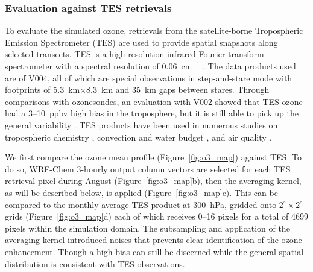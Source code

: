 \subsubsection{Evaluation against TES retrievals}\label{sect:val/o3/tes}


To evaluate the simulated ozone, retrievals from the satellite-borne
Tropospheric Emission Spectrometer (TES) are used to provide spatial snapshots
along selected transects. TES is a high resolution infrared Fourier-transform
spectrometer with a spectral resolution of 0.06~cm$^{-1}$ \citep{Beer:2006fk}.
The data products used are of V004, all of which are special observations in
step-and-stare mode with footprints of 5.3~km$\times$8.3~km and 35~km gaps
between stares. Through comparisons with ozonesondes, an evaluation with
V002 showed that TES ozone had a 3--10~ppbv high bias in the troposphere,
but it is still able to pick up the general variability \citep{Nassar:2008mw}. TES
products have been used in numerous studies on tropospheric chemistry
\citep[e.g.][]{Hegarty:2010vn,Voulgarakis:2011fk}, convection and water budget
\citep[e.g.][]{Brown:2008zr,Risi:2010ys}, and air quality
\citep[e.g.][]{McMillan:2010kx,Wang:2011uq}.

We first compare the ozone mean profile (Figure~\ref{fig:o3_map}) against TES. To
do so, WRF-Chem 3-hourly output column vectors are selected for each TES retrieval
pixel during August (Figure~\ref{fig:o3_map}b), then the averaging kernel, as will be
described below, is applied (Figure~\ref{fig:o3_map}c). This can be compared to the
monthly average TES product at 300~hPa, gridded onto $2^\circ\times2^\circ$ grids (Figure~\ref{fig:o3_map}d)
each of which receives 0--16 pixels for a total of 4699 pixels within the simulation
domain. The subsampling and application of the averaging kernel introduced noises
that prevents clear identification of the ozone enhancement. Though a high bias
can still be discerned while the general spatial distribution is consistent with TES observations.

